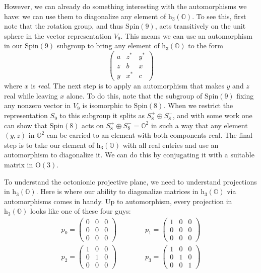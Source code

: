 \documentclass{article}
\begin{document}
However, we can already do something interesting with the automorphisms
we have: we can use them to diagonalize any element of
\(\mathrm{h}_3(\mathbb{O})\). To see this, first note that the rotation
group, and thus \(\mathrm{Spin}(9)\), acts transitively on the unit
sphere in the vector representation \(V_9\). This means we can use an
automorphism in our \(\mathrm{Spin}(9)\) subgroup to bring any element
of \(\mathrm{h}_3(\mathbb{O})\) to the form \[
  \left(
    \begin{array}{ccc}
      a&z^*&y^*
    \\z&b&x
    \\y&x^*&c
    \end{array}
  \right)
\] where \(x\) is \emph{real}. The next step is to apply an automorphism
that makes \(y\) and \(z\) real while leaving \(x\) alone. To do this,
note that the subgroup of \(\mathrm{Spin}(9)\) fixing any nonzero vector
in \(V_9\) is isomorphic to \(\mathrm{Spin}(8)\). When we restrict the
representation \(S_9\) to this subgroup it splits as
\(S_8^+\oplus S_8^-\), and with some work one can show that
\(\mathrm{Spin}(8)\) acts on \(S_8^+\oplus S_8^- = \mathbb{O}^2\) in
such a way that any element \((y,z)\) in \(\mathbb{O}^2\) can be carried
to an element with both components real. The final step is to take our
element of \(\mathrm{h}_3(\mathbb{O})\) with all real entries and use an
automorphism to diagonalize it. We can do this by conjugating it with a
suitable matrix in \(\mathrm{O}(3)\).

To understand the octonionic projective plane, we need to understand
projections in \(\mathrm{h}_3(\mathbb{O})\). Here is where our ability
to diagonalize matrices in \(\mathrm{h}_3(\mathbb{O})\) via
automorphisms comes in handy. Up to automorphism, every projection in
\(\mathrm{h}_3(\mathbb{O})\) looks like one of these four guys: \[
  \begin{gathered}
    p_0 =
    \left(
      \begin{array}{ccc}
        0&0&0\\0&0&0\\0&0&0
      \end{array}
    \right)
    \qquad\qquad
    p_1 =
    \left(
      \begin{array}{ccc}
        1&0&0\\0&0&0\\0&0&0
      \end{array}
    \right)
  \\p_2 =
    \left(
      \begin{array}{ccc}
        1&0&0\\0&1&0\\0&0&0
      \end{array}
    \right)
    \qquad\qquad
    p_3 =
    \left(
      \begin{array}{ccc}
        1&0&0\\0&1&0\\0&0&1
      \end{array}
    \right)
  \end{gathered}
\]
\end{document}
